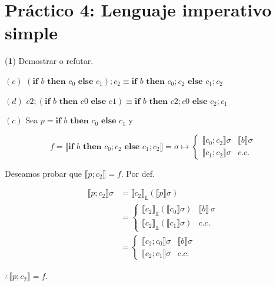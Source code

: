 \documentclass[a4paper, 12pt]{article}
\begin{document}
\pagebreak
\section{Práctico 4: Lenguaje imperativo simple}

\begin{myframe}
(\textbf{1}) Demostrar o refutar.

$(c)$ $(\textbf{if } b \textbf{ then } c_0 \textbf{ else } c_1);c_2 \equiv
\textbf{if } b \textbf{ then } c_0;c_2 \textbf{ else } c_1;c_2$

$(d)$ $c2; (\textbf{if } b \textbf{ then } c0 \textbf{ else } c1) \equiv \textbf{if } b
\textbf{ then } c2; c0 \textbf{ else } c_2; c_1$
\end{myframe}


$(c)$ Sea $p = \textbf{if } b \textbf{ then } c_0 \textbf{ else } c_1$ y

\begin{equation*}
  f = \llbracket \textbf{if } b \textbf{ then } c_0;c_2 \textbf{ else } c_1;c_2
  \rrbracket = \sigma \mapsto \begin{cases}
    \llbracket c_0;c_2 \rrbracket \sigma & \llbracket b \rrbracket \sigma \\ 
    \llbracket c_1;c_2 \rrbracket \sigma & c.c.
  \end{cases}
\end{equation*}

Deseamos probar que $\llbracket p;c_2 \rrbracket = f$. Por def. 

\begin{align*}
  \llbracket p;c_2 \rrbracket \sigma
  &= \llbracket c_2 \rrbracket_{\Bot}\left( \llbracket p \rrbracket \sigma \right) \\ 
  &= \begin{cases}
    \llbracket c_2 \rrbracket_{\Bot} \left(\llbracket c_0 \rrbracket
      \sigma\right) &
    \llbracket b \rrbracket ~ \sigma \\ 
    \llbracket c_2 \rrbracket_{\Bot} \left(\llbracket c_1 \rrbracket
      \sigma\right) & c.c.
  \end{cases} \\ 
  &= \begin{cases}
    \llbracket c_2;c_0 \rrbracket \sigma & \llbracket b \rrbracket \sigma \\ 
    \llbracket c_2;c_1 \rrbracket \sigma & c.c.
  \end{cases}
\end{align*}

$\therefore \llbracket p;c_2 \rrbracket = f$.
\end{document}
